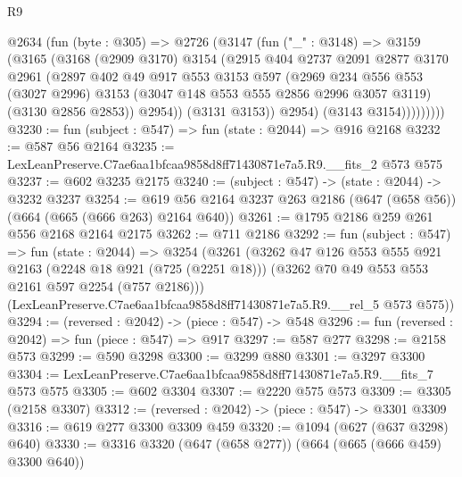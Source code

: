 \begin{lexlean}{R9}
\begin{coremodule}
            @2634
              (fun (byte : @305) =>
              @2726
                (@3147
                  (fun ("_" : @3148) =>
                  @3159
                    (@3165
                      (@3168
                        (@2909 @3170)
                        @3154
                        (@2915
                          @404
                          @2737
                          @2091
                          @2877
                          @3170
                          @2961
                          (@2897
                            @402
                            @49
                            @917
                            @553
                            @3153
                            @597
                            (@2969
                              @234
                              @556
                              @553
                              (@3027 @2996)
                              @3153
                              (@3047 @148 @553 @555 @2856 @2996 @3057 @3119)
                              (@3130 @2856 @2853))
                            @2954))
                        (@3131 @3153))
                      @2954)
                    (@3143 @3154)))))))))
@3230 := fun (subject : @547) => fun (state : @2044) => @916 @2168
@3232 := @587 @56 @2164
@3235 := LexLeanPreserve.C7ae6aa1bfcaa9858d8ff71430871e7a5.R9.__fits_2 @573 @575
@3237 := @602 @3235 @2175
@3240 := (subject : @547) -> (state : @2044) -> @3232 @3237
@3254 := @619 @56 @2164 @3237 @263 @2186 (@647 (@658 @56)) (@664 (@665 (@666 @263) @2164 @640))
@3261 := @1795 @2186 @259 @261 @556 @2168 @2164 @2175
@3262 := @711 @2186
@3292 := fun (subject : @547) =>
  fun (state : @2044) =>
  @3254
    (@3261
      (@3262
        @47
        @126
        @553
        @555
        @921
        @2163
        (@2248 @18 @921 (@725 (@2251 @18)))
        (@3262 @70 @49 @553 @553 @2161 @597 @2254 (@757 @2186)))
      (LexLeanPreserve.C7ae6aa1bfcaa9858d8ff71430871e7a5.R9.__rel_5 @573 @575))
@3294 := (reversed : @2042) -> (piece : @547) -> @548
@3296 := fun (reversed : @2042) => fun (piece : @547) => @917
@3297 := @587 @277
@3298 := @2158 @573
@3299 := @590 @3298
@3300 := @3299 @880
@3301 := @3297 @3300
@3304 := LexLeanPreserve.C7ae6aa1bfcaa9858d8ff71430871e7a5.R9.__fits_7 @573 @575
@3305 := @602 @3304
@3307 := @2220 @575 @573
@3309 := @3305 (@2158 @3307)
@3312 := (reversed : @2042) -> (piece : @547) -> @3301 @3309
@3316 := @619 @277 @3300 @3309 @459
@3320 := @1094 (@627 (@637 @3298) @640)
@3330 := @3316 @3320 (@647 (@658 @277)) (@664 (@665 (@666 @459) @3300 @640))

\end{coremodule}
\end{lexlean}
